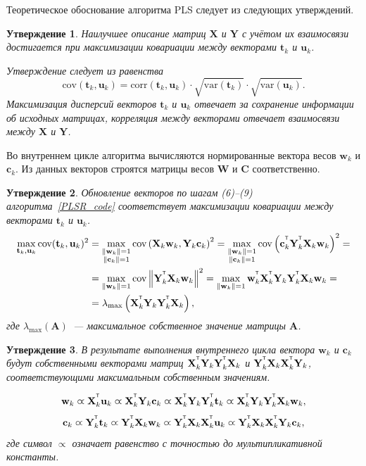 \documentclass[12pt,twoside]{article}
\newtheorem{statement}{Утверждение}
\newcommand{\bw}{\mathbf{w}}
\newcommand{\bY}{\mathbf{Y}}
\newcommand{\bX}{\mathbf{X}}
\newcommand{\bu}{\mathbf{u}}
\newcommand{\bt}{\mathbf{t}}
\newcommand{\bc}{\mathbf{c}}
\newcommand{\bC}{\mathbf{C}}
\newcommand{\bW}{\mathbf{W}}
\newcommand{\T}{^{\text{\tiny\sffamily\upshape\mdseries T}}}
\begin{document}
Теоретическое обоснование алгоритма PLS следует из следующих утверждений.
\begin{statement}
Наилучшее описание матриц $\bX$ и $\bY$ с учётом их взаимосвязи достигается при максимизации ковариации между векторами $\bt_k$ и $\bu_k$. 

Утверждение следует из равенства
\[
	\text{cov} (\bt_k, \bu_k) = \text{corr} (\bt_k, \bu_k) \cdot \sqrt{\text{var}(\bt_k)} \cdot \sqrt{\text{var}(\bu_k)}.
\]
Максимизация дисперсий векторов $\bt_k$ и $\bu_k$ отвечает за сохранение информации об исходных матрицах, 
корреляция между векторами отвечает взаимосвязи между $\bX$ и $\bY$.
\end{statement}
Во внутреннем цикле алгоритма вычисляются нормированные вектора весов $\bw_k$ и $\bc_k$. Из данных векторов строятся матрицы весов $\bW$ и $\bC$ соответственно.
\begin{statement}
Обновление векторов по шагам (6)--(9) алгоритма~\ref{PLSR_code} соответствует максимизации ковариации между векторами $\bt_k$ и $\bu_k$.
\begin{align*}
\max_{\bt_k, \bu_k}  \text{cov} (\bt_k, \bu_k)^2 &= \max_{\substack{\|\bw_k\|=1 \\ \|\bc_k\| = 1}} \text{cov} \left( \bX_k \bw_k, \bY_k \bc_k \right)^2 = \max_{\substack{\|\bw_k\|=1 \\ \|\bc_k\| = 1}} \text{cov} \left(\bc_k^{\T}  \bY_k^{\T} \bX_k \bw_k \right)^2 = \\
&= \max_{\|\bw_k\| = 1} \text{cov} \left\|\bY_k^{\T} \bX_k \bw_k \right\|^2 = \max_{\|\bw_k\| = 1} \bw_k^{\T} \bX_k^{\T} \bY_k \bY_k^{\T} \bX_k \bw_k = \\
& = \lambda_{\max} \left( \bX_k^{\T} \bY_k \bY_k^{\T} \bX_k \right),
\end{align*}
где $ \lambda_{\max} (\mathbf{A})$~--- максимальное собственное значение матрицы $\mathbf{A}$.
\end{statement}

\begin{statement}
В результате выполнения внутреннего цикла вектора $\bw_k$ и $\bc_k$ будут собственными векторами матриц $\bX_k^{\T} \bY_k \bY_k^{\T} \bX_k$ и $\bY_k^{\T} \bX_k \bX_k^{\T} \bY_k$, соответствующими максимальным собственным значениям.

\begin{equation*}
\bw_k \varpropto \bX_k^{\T} \bu_k \varpropto \bX_k^{\T} \bY_k \bc_k \varpropto \bX_k^{\T} \bY_k \bY_k^{\T} \bt_k \varpropto \bX_k^{\T} \bY_k \bY_k^{\T} \bX_k \bw_k,
\end{equation*}
\begin{equation*}
\bc_k \varpropto \bY_k^{\T} \bt_k \varpropto \bY_k^{\T} \bX_k \bw_k \varpropto \bY_k^{\T} \bX_k \bX_k^{\T} \bu_k \varpropto \bY_k^{\T} \bX_k \bX_k^{\T} \bY_k \bc_k,
\end{equation*}
где символ $\varpropto$ означает равенство с точностью до мультипликативной константы. 
\end{statement}
\end{document}
